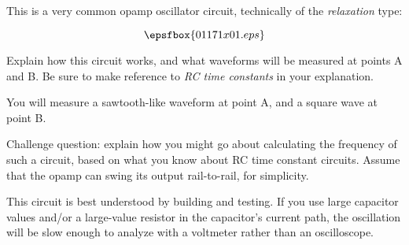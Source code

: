 

This is a very common opamp oscillator circuit, technically of the {\it relaxation} type:

$$\epsfbox{01171x01.eps}$$

Explain how this circuit works, and what waveforms will be measured at points A and B.  Be sure to make reference to {\it RC time constants} in your explanation.







You will measure a sawtooth-like waveform at point A, and a square wave at point B.

\vskip 10pt

Challenge question: explain how you might go about calculating the frequency of such a circuit, based on what you know about RC time constant circuits.  Assume that the opamp can swing its output rail-to-rail, for simplicity.







This circuit is best understood by building and testing.  If you use large capacitor values and/or a large-value resistor in the capacitor's current path, the oscillation will be slow enough to analyze with a voltmeter rather than an oscilloscope.




